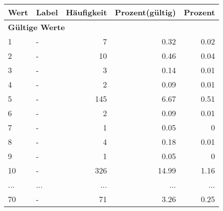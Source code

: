      \begin{longtable}{lXrrr}
     \toprule
     \textbf{Wert} & \textbf{Label} & \textbf{Häufigkeit} & \textbf{Prozent(gültig)} & \textbf{Prozent} \\
     \endhead
     \midrule
     \multicolumn{5}{l}{\textbf{Gültige Werte}}\\
        1 & \multicolumn{1}{X}{-} & %
          \num{7} &
          \num[round-mode=places,round-precision=2]{0,32} &
          \num[round-mode=places,round-precision=2]{0,02} \\
        2 & \multicolumn{1}{X}{-} & %
          \num{10} &
          \num[round-mode=places,round-precision=2]{0,46} &
          \num[round-mode=places,round-precision=2]{0,04} \\
        3 & \multicolumn{1}{X}{-} & %
          \num{3} &
          \num[round-mode=places,round-precision=2]{0,14} &
          \num[round-mode=places,round-precision=2]{0,01} \\
        4 & \multicolumn{1}{X}{-} & %
          \num{2} &
          \num[round-mode=places,round-precision=2]{0,09} &
          \num[round-mode=places,round-precision=2]{0,01} \\
        5 & \multicolumn{1}{X}{-} & %
          \num{145} &
          \num[round-mode=places,round-precision=2]{6,67} &
          \num[round-mode=places,round-precision=2]{0,51} \\
        6 & \multicolumn{1}{X}{-} & %
          \num{2} &
          \num[round-mode=places,round-precision=2]{0,09} &
          \num[round-mode=places,round-precision=2]{0,01} \\
        7 & \multicolumn{1}{X}{-} & %
          \num{1} &
          \num[round-mode=places,round-precision=2]{0,05} &
          \num[round-mode=places,round-precision=2]{0} \\
        8 & \multicolumn{1}{X}{-} & %
          \num{4} &
          \num[round-mode=places,round-precision=2]{0,18} &
          \num[round-mode=places,round-precision=2]{0,01} \\
        9 & \multicolumn{1}{X}{-} & %
          \num{1} &
          \num[round-mode=places,round-precision=2]{0,05} &
          \num[round-mode=places,round-precision=2]{0} \\
        10 & \multicolumn{1}{X}{-} & %
          \num{326} &
          \num[round-mode=places,round-precision=2]{14,99} &
          \num[round-mode=places,round-precision=2]{1,16} \\
       ... & ... & ... & ... & ... \\
        70 & \multicolumn{1}{X}{-} & %
          \num{71} &
          \num[round-mode=places,round-precision=2]{3,26} &
          \num[round-mode=places,round-precision=2]{0,25} \\


\end{longtable}
